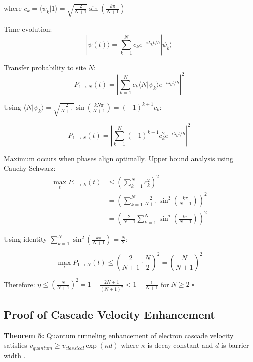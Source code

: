 where $c_k = \langle\psi_k|1\rangle = \sqrt{\frac{2}{N+1}} \sin\left(\frac{k\pi}{N+1}\right)$

Time evolution:
\begin{equation}
|\psi(t)\rangle = \sum_{k=1}^N c_k e^{-i\lambda_k t/\hbar} |\psi_k\rangle
\end{equation}

Transfer probability to site $N$:
\begin{equation}
P_{1 \rightarrow N}(t) = \left|\sum_{k=1}^N c_k \langle N|\psi_k\rangle e^{-i\lambda_k t/\hbar}\right|^2
\end{equation}

Using $\langle N|\psi_k\rangle = \sqrt{\frac{2}{N+1}} \sin\left(\frac{kN\pi}{N+1}\right) = (-1)^{k+1} c_k$:

\begin{equation}
P_{1 \rightarrow N}(t) = \left|\sum_{k=1}^N (-1)^{k+1} c_k^2 e^{-i\lambda_k t/\hbar}\right|^2
\end{equation}

Maximum occurs when phases align optimally. Upper bound analysis using Cauchy-Schwarz:
\begin{align}
\max_t P_{1 \rightarrow N}(t) &\leq \left(\sum_{k=1}^N c_k^2\right)^2 \\
&= \left(\sum_{k=1}^N \frac{2}{N+1} \sin^2\left(\frac{k\pi}{N+1}\right)\right)^2 \\
&= \left(\frac{2}{N+1} \sum_{k=1}^N \sin^2\left(\frac{k\pi}{N+1}\right)\right)^2
\end{align}

Using identity $\sum_{k=1}^N \sin^2\left(\frac{k\pi}{N+1}\right) = \frac{N}{2}$:

\begin{equation}
\max_t P_{1 \rightarrow N}(t) \leq \left(\frac{2}{N+1} \cdot \frac{N}{2}\right)^2 = \left(\frac{N}{N+1}\right)^2
\end{equation}

Therefore: $\eta \leq \left(\frac{N}{N+1}\right)^2 = 1 - \frac{2N+1}{(N+1)^2} < 1 - \frac{1}{N+1}$ for $N \geq 2$ $\square$

\subsection{Proof of Cascade Velocity Enhancement}

\textbf{Theorem 5:} Quantum tunneling enhancement of electron cascade velocity satisfies $v_{quantum} \geq v_{classical} \exp(\kappa d)$ where $\kappa$ is decay constant and $d$ is barrier width \cite{griffiths2004introduction}.

